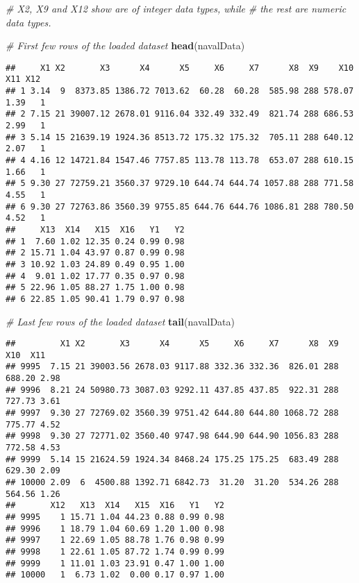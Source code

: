 \documentclass[
]{article}
\newenvironment{Shaded}{\begin{snugshade}}{\end{snugshade}}
\newcommand{\CommentTok}[1]{\textcolor[rgb]{0.56,0.35,0.01}{\textit{#1}}}
\newcommand{\KeywordTok}[1]{\textcolor[rgb]{0.13,0.29,0.53}{\textbf{#1}}}
\newcommand{\NormalTok}[1]{#1}
\begin{document}
\begin{Shaded}
\begin{Highlighting}[]
\CommentTok{# X2, X9 and X12 show are of integer data types, while }
\CommentTok{# the rest are numeric data types.}

\CommentTok{# First few rows of the loaded dataset}
\KeywordTok{head}\NormalTok{(navalData)}
\end{Highlighting}
\end{Shaded}

\begin{verbatim}
##     X1 X2       X3      X4      X5     X6     X7      X8  X9    X10  X11 X12
## 1 3.14  9  8373.85 1386.72 7013.62  60.28  60.28  585.98 288 578.07 1.39   1
## 2 7.15 21 39007.12 2678.01 9116.04 332.49 332.49  821.74 288 686.53 2.99   1
## 3 5.14 15 21639.19 1924.36 8513.72 175.32 175.32  705.11 288 640.12 2.07   1
## 4 4.16 12 14721.84 1547.46 7757.85 113.78 113.78  653.07 288 610.15 1.66   1
## 5 9.30 27 72759.21 3560.37 9729.10 644.74 644.74 1057.88 288 771.58 4.55   1
## 6 9.30 27 72763.86 3560.39 9755.85 644.76 644.76 1086.81 288 780.50 4.52   1
##     X13  X14   X15  X16   Y1   Y2
## 1  7.60 1.02 12.35 0.24 0.99 0.98
## 2 15.71 1.04 43.97 0.87 0.99 0.98
## 3 10.92 1.03 24.89 0.49 0.95 1.00
## 4  9.01 1.02 17.77 0.35 0.97 0.98
## 5 22.96 1.05 88.27 1.75 1.00 0.98
## 6 22.85 1.05 90.41 1.79 0.97 0.98
\end{verbatim}

\begin{Shaded}
\begin{Highlighting}[]
\CommentTok{# Last few rows of the loaded dataset }
\KeywordTok{tail}\NormalTok{(navalData)       }
\end{Highlighting}
\end{Shaded}

\begin{verbatim}
##         X1 X2       X3      X4      X5     X6     X7      X8  X9    X10  X11
## 9995  7.15 21 39003.56 2678.03 9117.88 332.36 332.36  826.01 288 688.20 2.98
## 9996  8.21 24 50980.73 3087.03 9292.11 437.85 437.85  922.31 288 727.73 3.61
## 9997  9.30 27 72769.02 3560.39 9751.42 644.80 644.80 1068.72 288 775.77 4.52
## 9998  9.30 27 72771.02 3560.40 9747.98 644.90 644.90 1056.83 288 772.58 4.53
## 9999  5.14 15 21624.59 1924.34 8468.24 175.25 175.25  683.49 288 629.30 2.09
## 10000 2.09  6  4500.88 1392.71 6842.73  31.20  31.20  534.26 288 564.56 1.26
##       X12   X13  X14   X15  X16   Y1   Y2
## 9995    1 15.71 1.04 44.23 0.88 0.99 0.98
## 9996    1 18.79 1.04 60.69 1.20 1.00 0.98
## 9997    1 22.69 1.05 88.78 1.76 0.98 0.99
## 9998    1 22.61 1.05 87.72 1.74 0.99 0.99
## 9999    1 11.01 1.03 23.91 0.47 1.00 1.00
## 10000   1  6.73 1.02  0.00 0.17 0.97 1.00
\end{verbatim}
\end{document}
